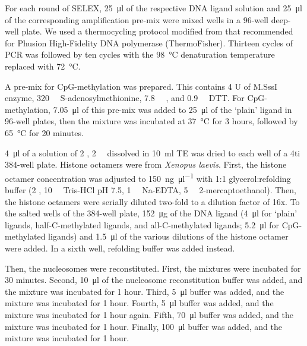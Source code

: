 \documentclass[parskip=full, numbers=noenddot]{scrreprt}
\begin{document}

For each round of SELEX, \SI{25}{\micro\litre} of the respective DNA ligand solution and \SI{25}{\micro\litre} of the corresponding amplification pre-mix were mixed wells in a 96-well deep-well plate. We used a thermocycling protocol modified from that recommended for Phusion High-Fidelity DNA polymerase (ThermoFisher). Thirteen cycles of PCR was followed by ten cycles with the \SI{98}{\celsius} denaturation temperature replaced with \SI{72}{\celsius}.

A pre-mix for CpG-methylation was prepared. This contains 4 U of M.SssI enzyme, \SI{320}{\micro\Molar} S-adenosylmethionine, \SI{7.8}{\milli\Molar} ,
and \SI{0.9}{\milli\Molar} DTT. For CpG-methylation, \SI{7.05}{\micro\litre} of this pre-mix was added to \SI{25}{\micro\litre} of the `plain' ligand in 96-well plates, then the mixture was incubated at \SI{37}{\celsius} for 3 hours, followed by \SI{65}{\celsius} for 20 minutes.

\SI{4}{\micro\litre} of a solution of \SI{2}{\Molar} , \SI{2}{\milli\Molar}  dissolved in \SI{10}{\milli\litre} TE was dried to each well of a 4ti 384-well plate. Histone octamers were from \emph{Xenopus laevis}. First, the histone octamer concentration was adjusted to \SI{150}{\nano\gram\per\micro\litre} with 1:1 glycerol:refolding buffer (\SI{2}{\Molar} , \SI{10}{\milli\Molar} Tris-HCl pH 7.5, \SI{1}{\milli\Molar} Na-EDTA, \SI{5}{\milli\Molar} 2-mercaptoethanol). Then, the histone octamers were serially diluted two-fold to a dilution factor of 16x. To the salted wells of the 384-well plate, \SI{152}{\micro\gram} of the DNA ligand (\SI{4}{\micro\litre} for ‘plain’ ligands, half-C-methylated ligands, and all-C-methylated ligands; \SI{5.2}{\micro\litre} for CpG-methylated ligands) and \SI{1.5}{\micro\litre} of the various dilutions of the histone octamer were added. In a sixth well, refolding buffer was added instead.

Then, the nucleosomes were reconstituted. First, the mixtures were incubated for 30 minutes. Second, \SI{10}{\micro\litre} of the nucleosome reconstitution buffer was added, and the mixture was incubated for 1 hour. Third, \SI{5}{\micro\litre} buffer was added, and the mixture was incubated for 1 hour. Fourth, \SI{5}{\micro\litre} buffer was added, and the mixture was incubated for 1 hour again. Fifth, \SI{70}{\micro\litre} buffer was added, and the mixture was incubated for 1 hour. Finally, \SI{100}{\micro\litre} buffer was added, and the mixture was incubated for 1 hour.
\end{document}
